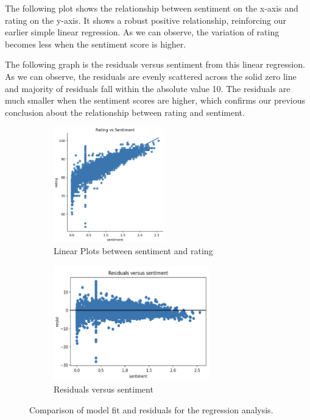 \documentclass{article}
\begin{document}
The following plot shows the relationship between sentiment on the x-axis and rating on the y-axis. It shows a robust positive relationship, reinforcing our earlier simple linear regression. As we can observe, the variation of rating becomes less when the sentiment score is higher. 

The following graph is the residuals versus sentiment from this linear regression. As we can observe, the residuals are evenly scattered across the solid zero line and majority of residuals fall within the absolute value 10. The residuals are much smaller when the sentiment scores are higher, which confirms our previous conclusion about the relationship between rating and sentiment.
\begin{figure}[!ht]
    \centering
    \begin{subfigure}[b]{0.45\linewidth}
        \centering
        \includegraphics[height=5cm]{sentiment_rating.png}
        \caption{Linear Plots between sentiment and rating}
        \label{fig:sentiment_rating}
    \end{subfigure}
    \hfill
    \begin{subfigure}[b]{0.45\linewidth}
        \centering
        \includegraphics[height=5cm]{residuals.png}
        \caption{Residuals versus sentiment}
        \label{fig:residuals}
    \end{subfigure}
    \caption{Comparison of model fit and residuals for the regression analysis.}
    \label{fig:side_by_side_equal_height}
\end{figure}
\end{document}
